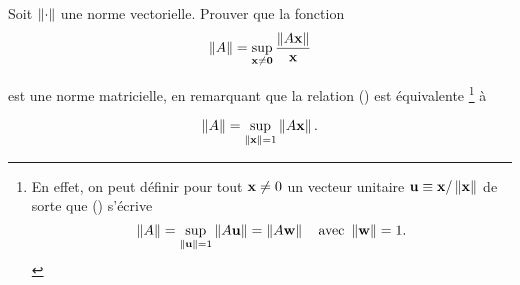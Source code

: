 Soit $\left\lVert\cdot\right\rVert$ une norme vectorielle. Prouver que la fonction
\begin{equation}
\label{eq:norm}
  \left\lVert A\right\rVert = \sup_{\mathbf{x \neq 0}} \dfrac{\left\lVert A \mathbf{x}\right\rVert}{\mathbf{x}}
\end{equation}

est une norme matricielle, en remarquant que la relation () est équivalente \footnote{En effet, on peut définir pour tout $\mathbf{x} \neq 0$ un vecteur unitaire $\mathbf{u} \equiv \mathbf{x} /\left\lVert\mathbf{x}\right\rVert$ de sorte que () s'écrive
\begin{equation*}
  \left\lVert A\right\rVert = \sup_{\left\lVert\mathbf{u}\right\rVert = 1} \left\lVert A \mathbf{u}\right\rVert = \left\lVert A \mathbf{w}\right\rVert
  \quad \text{avec }
  \left\lVert\mathbf{w}\right\rVert = 1.
\end{equation*}} à

\begin{equation*}
  \left\lVert A\right\rVert = \sup_{\left\lVert\mathbf{x}\right\rVert = 1} \left\lVert A \mathbf{x}\right\rVert.
\end{equation*}
